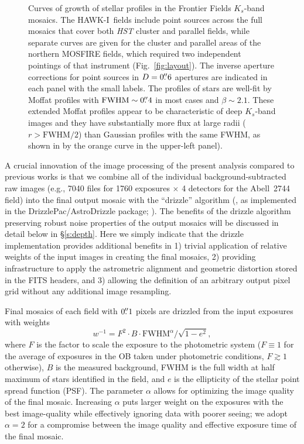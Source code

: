 \documentclass[preprint2]{aastex6}
\gdef\HAWKI{\mbox{HAWK-I}}
\begin{document}
\begin{figure*}[!t]
\caption{Curves of growth of stellar profiles in the Frontier Fields $K_s$-band mosaics.  The \HAWKI\ fields include point sources across the full mosaics that cover both \textit{HST} cluster and parallel fields, while separate curves are given for the cluster and parallel areas of the northern MOSFIRE fields, which required two independent pointings of that instrument (Fig.~\ref{fig:layout}).  The inverse aperture corrections for point sources in $D=0\mbox{$.\!\!^{\prime\prime}$}6$ apertures are indicated in each panel with the small labels.  The profiles of stars are well-fit by Moffat profiles with $\mathrm{FWHM}\sim0\mbox{$.\!\!^{\prime\prime}$}4$ in most cases and $\beta\sim2.1$.  These extended Moffat profiles appear to be characteristic of deep $K_s$-band images and they have substantially more flux at large radii ($r>\mathrm{FWHM}/2$) than Gaussian profiles with the same FWHM, as shown in by the orange curve in the upper-left panel). \label{fig:cog}}  
\end{figure*}

A crucial innovation of the image processing of the present analysis compared to previous works is that we combine all of the individual background-subtracted raw images (e.g., 7040 files for 1760 exposures $\times$ 4 detectors for the \mbox{Abell 2744} field) into the final output mosaic with the ``drizzle'' algorithm (\citealp{fruchter:02}, as implemented in the DrizzlePac/AstroDrizzle package; \citealp{drizzlepac}).  The benefits of the drizzle algorithm  preserving robust noise properties of the output mosaics will be discussed in detail below in \S\ref{s:depth}.  Here we simply indicate that the drizzle implementation provides additional benefits in 1) trivial application of relative weights of the input images in creating the final mosaics, 2) providing infrastructure to apply the astrometric alignment and geometric distortion stored in the FITS headers, and 3) allowing the definition of an arbitrary output pixel grid without any additional image resampling.

Final mosaics of each field with $0\mbox{$.\!\!^{\prime\prime}$}1$ pixels are drizzled from the input exposures with weights
\begin{equation}
w^{-1} = F^2\cdot B \cdot \mathrm{FWHM}^\alpha / \sqrt{1-e^2}, 
\label{eq:weight}
\end{equation}
where $F$ is the factor to scale the exposure to the photometric system ($F\equiv1$ for the average of exposures in the OB taken under photometric conditions, $F\gtrsim1$ otherwise), $B$ is the measured background, FWHM is the full width at half maximum of stars identified in the field, and $e$ is the ellipticity of the stellar point spread function (PSF).  The parameter $\alpha$ allows for optimizing the image quality of the final mosaic.  Increasing $\alpha$ puts larger weight on the exposures with the best image-quality while effectively ignoring data with poorer seeing; we adopt $\alpha=2$ for a compromise between the image quality and effective exposure time of the final mosaic.  
\end{document}
